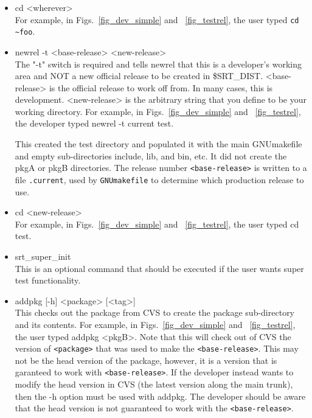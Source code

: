 \documentclass[12pt]{article}
\begin{document}
\begin{itemize}
\item {\ttfamily cd <wherever>}\\
      For example, in Figs.~\ref{fig_dev_simple} and ~\ref{fig_testrel},
the user typed {\ttfamily \verb|cd ~foo|}.
\item {\ttfamily newrel -t <base-release> <new-release>} \\
     The "-t" switch is required and tells newrel that this is a developer's
working area and NOT a new official release to be created in \$SRT\_DIST. 
<base-release> is the official release to work off from. In many cases,
this is development. <new-release> is the arbitrary string that you
define to be your working directory. 
For example, in Figs.~\ref{fig_dev_simple} and ~\ref{fig_testrel},
the developer typed {\ttfamily newrel -t current test}.

This created the {\ttfamily test} directory and populated it with the main 
GNUmakefile and empty sub-directories include, lib, and bin, etc.  
It did not
create the {\ttfamily pkgA} or {\ttfamily pkgB} directories.
The release number 
\texttt{<base-release>} is written to a file \texttt{.current}, used by 
\texttt{GNUmakefile} to determine which production release to use.
\item {\ttfamily cd <new-release>} \\
For example, in Figs.~\ref{fig_dev_simple} and ~\ref{fig_testrel},
the user typed {\ttfamily cd test}.
\item {\ttfamily srt\_super\_init } \\
	This is an optional command that should be executed if the user
wants super test functionality. 


\item {\ttfamily addpkg [-h] <package> [<tag>]}\\
This checks out the package from CVS to create the package sub-directory
and its contents. 
For example, in Figs.~\ref{fig_dev_simple} and ~\ref{fig_testrel},
the user typed {\ttfamily addpkg <pkgB>}.
Note that this will check out of CVS the 
version of \texttt{<package>} that was used
to make the \texttt{<base-release>}.  This may not be the head version of the 
package,
however, it is a version that is garanteed to work with 
\texttt{<base-release>}.  If
the developer instead wants to modify the head version in CVS (the latest 
version along the main trunk), then the -h option must be used with addpkg.
The developer should be aware that the head version is not guaranteed to 
work with the \texttt{<base-release>}.


\end{itemize}
\end{document}
